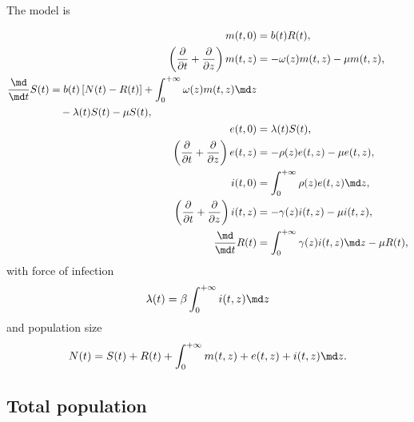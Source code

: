 \documentclass{jpmarticle}
\let\subequationsorig\subequations%
\let\endsubequationsorig\endsubequations%
\renewenvironment{subequations}{
  \subequationsorig
  \renewcommand{\theequation}{\theparentequation.\arabic{equation}}
}{
  \endsubequationsorig
}
\begin{document}
The model is
\begin{subequations}
  \label{model_time_since_entry_structured}
  \begin{align}
    m(t, 0) &=
    b(t) R(t),
    \\
    \left(\frac{\partial}{\partial t}
      + \frac{\partial}{\partial z}\right)
    m(t, z) &=
    - \omega(z) m(t, z) - \mu m(t, z),
    \\
    \begin{split}
      \frac{\md}{\md t} S(t) &=
      b(t) \left[N(t) - R(t)\right]
      + \int_0^{+\infty} \omega(z) m(t, z) \md z
      \\ & \quad {}
      - \lambda(t) S(t) - \mu S(t),
    \end{split}
    \\
    e(t, 0) &=
    \lambda(t) S(t),
    \\
    \left(\frac{\partial}{\partial t}
      + \frac{\partial}{\partial z}\right)
    e(t, z) &=
    - \rho(z) e(t, z) - \mu e(t, z),
    \\
    i(t, 0) &=
    \int_0^{+\infty} \rho(z) e(t, z) \md z,
    \\
    \left(\frac{\partial}{\partial t}
      + \frac{\partial}{\partial z}\right)
    i(t, z) &=
    - \gamma(z) i(t, z) - \mu i(t, z),
    \\
    \frac{\md}{\md t} R(t) &=
    \int_0^{+\infty} \gamma(z) i(t, z) \md z
    - \mu R(t),
  \end{align}
  with force of infection
  \begin{equation}
    \lambda(t) = \beta \int_0^{+\infty} i(t, z) \md z
  \end{equation}
  and population size
  \begin{equation}
    N(t) =
    S(t) + R(t)
    + \int_0^{+\infty} m(t, z) + e(t, z) + i(t, z) \md z.
  \end{equation}
\end{subequations}


\subsection{Total population}
\end{document}
